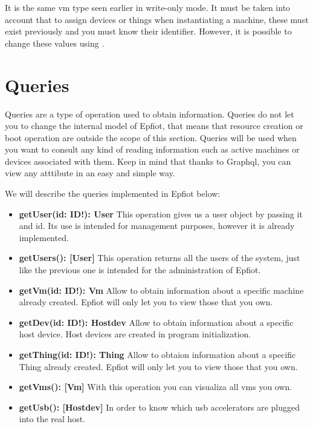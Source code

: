 It is the same vm type seen earlier in write-only mode. It must be taken into account that to assign devices or things when instantiating a machine, these must exist previously and you must know their identifier. However, it is possible to change these values using .
\newpage


\section{Queries}
\label{makereference5.2}

Queries are a type of operation used to obtain information. Queries do not let you to change the internal model of Epfiot, that means that resource creation or boot operation are outside the scope of this section.
Queries will be used when you want to consult any kind of reading information such as active machines or devices associated with them. Keep in mind that thanks to Graphql, you can view any atttibute in an easy and simple way.

We will describe the queries implemented in Epfiot below:


\begin{itemize}
    \item \textbf{getUser(id: ID!): User}\hfill\break
    This operation gives us a user object by passing it and id. Its use is intended for management purposes, however it is already implemented.
    \item \textbf{getUsers(): [User]}\hfill\break
    This operation returns all the users of the system, just like the previous one is intended for the administration of Epfiot.
    \item \textbf{getVm(id: ID!): Vm}\hfill\break
    Allow to obtain information about a specific machine already created. Epfiot will only let you to view those that you own.
    \item \textbf{getDev(id: ID!): Hostdev}\hfill\break
    Allow to obtain information about a specific host device. Host devices are created in program initialization.
    \item \textbf{getThing(id: ID!): Thing}\hfill\break
    Allow to obtaion information about a specific Thing already created. Epfiot will only let you to view those that you own.
    \item \textbf{getVms(): [Vm]}\hfill\break
    With this operation you can visualiza all vms you own.
    \item \textbf{getUsb(): [Hostdev]}\hfill\break
    In order to know which usb accelerators are plugged into the real host.
\end{itemize}

